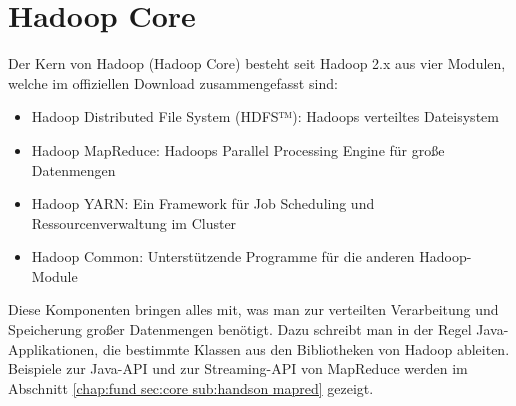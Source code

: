 \section{Hadoop Core}
Der Kern von Hadoop (Hadoop Core) besteht seit Hadoop 2.x aus vier Modulen, welche im offiziellen Download zusammengefasst sind\cite{noauthor_apache_nodate}:
\begin{itemize}
    \item Hadoop Distributed File System (HDFS™): Hadoops verteiltes Dateisystem
    \item Hadoop MapReduce: Hadoops Parallel Processing Engine für große Datenmengen
    \item Hadoop YARN: Ein Framework für Job Scheduling und Ressourcenverwaltung im Cluster
    \item Hadoop Common: Unterstützende Programme für die anderen Hadoop-Module
\end{itemize}
Diese Komponenten bringen alles mit, was man zur verteilten Verarbeitung und Speicherung großer Datenmengen benötigt. Dazu schreibt man in der Regel Java-Applikationen, die bestimmte Klassen aus den Bibliotheken von Hadoop ableiten. Beispiele zur Java-API und zur Streaming-API von MapReduce werden im Abschnitt \ref{chap:fund sec:core sub:handson mapred} gezeigt. 

